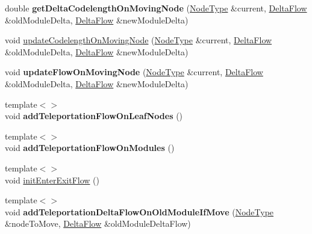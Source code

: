 \begin{DoxyCompactItemize}
\item 
\mbox{\label{classInfomapGreedySpecialized_a74770140c946e45361a1506b5a2b40fe}} 
double {\bfseries get\+Delta\+Codelength\+On\+Moving\+Node} (\mbox{\hyperlink{classNode}{Node\+Type}} \&current, \mbox{\hyperlink{structDeltaFlow}{Delta\+Flow}} \&old\+Module\+Delta, \mbox{\hyperlink{structDeltaFlow}{Delta\+Flow}} \&new\+Module\+Delta)
\item 
void \mbox{\hyperlink{classInfomapGreedySpecialized_a6f4ff75d89a26f1b474ca5a2190878c7}{update\+Codelength\+On\+Moving\+Node}} (\mbox{\hyperlink{classNode}{Node\+Type}} \&current, \mbox{\hyperlink{structDeltaFlow}{Delta\+Flow}} \&old\+Module\+Delta, \mbox{\hyperlink{structDeltaFlow}{Delta\+Flow}} \&new\+Module\+Delta)
\item 
\mbox{\label{classInfomapGreedySpecialized_a88be662d41bb5064cd54b7309a831f0c}} 
void {\bfseries update\+Flow\+On\+Moving\+Node} (\mbox{\hyperlink{classNode}{Node\+Type}} \&current, \mbox{\hyperlink{structDeltaFlow}{Delta\+Flow}} \&old\+Module\+Delta, \mbox{\hyperlink{structDeltaFlow}{Delta\+Flow}} \&new\+Module\+Delta)
\item 
\mbox{\label{classInfomapGreedySpecialized_afa44b4504548744d27ff60c145f0a7f9}} 
{\footnotesize template$<$$>$ }\\void {\bfseries add\+Teleportation\+Flow\+On\+Leaf\+Nodes} ()
\item 
\mbox{\label{classInfomapGreedySpecialized_a5e08e332374478ccb12de4eee9d67f74}} 
{\footnotesize template$<$$>$ }\\void {\bfseries add\+Teleportation\+Flow\+On\+Modules} ()
\item 
{\footnotesize template$<$$>$ }\\void \mbox{\hyperlink{classInfomapGreedySpecialized_a8a43bd2e0610fb4e5a9375f1c36202ec}{init\+Enter\+Exit\+Flow}} ()
\item 
\mbox{\label{classInfomapGreedySpecialized_a75e11276dfb6864051923f5c37797908}} 
{\footnotesize template$<$$>$ }\\void {\bfseries add\+Teleportation\+Delta\+Flow\+On\+Old\+Module\+If\+Move} (\mbox{\hyperlink{classNode}{Node\+Type}} \&node\+To\+Move, \mbox{\hyperlink{structDeltaFlow}{Delta\+Flow}} \&old\+Module\+Delta\+Flow)

\end{DoxyCompactItemize}
